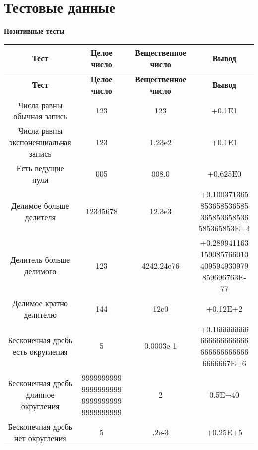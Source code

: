 \chapter{Тестовые данные}
{\noindent \textbf {Позитивные тесты}}
\begin{longtable}{|c|c|c|c|}
	\hline
	\textbf{Тест}& \textbf{Целое число} & \textbf{Вещественное число} & \textbf{Вывод} \\
	\hline
	\endfirsthead
	\hline
	\textbf{Тест}& \textbf{Целое число} & \textbf{Вещественное число} & \textbf{Вывод} \\
	\hline
	\endhead
	\makecell{Числа равны\\обычная запись} & 123 & 123 & +0.1E1 \\
	\hline
	\makecell{Числа равны\\экспоненциальная\\запись} & 123 & 1.23e2 & +0.1E1 \\
	\hline
	Есть ведущие нули & 005 & 008.0 & +0.625E0 \\
	\hline
	\makecell{Делимое больше\\делителя} & 12345678 & 12.3e3 & \makecell{+0.100371365\\853658536585\\365853658536\\585365853E+4} \\
	\hline
	\makecell{Делитель больше\\делимого} & 123 & 4242.24e76 & \makecell{+0.289941163\\159085766010\\409594930979\\859696763E-77} \\
	\hline
	\makecell{Делимое кратно\\делителю} & 144 & 12e0 & +0.12E+2 \\
	\hline
	\makecell{Бесконечная дробь\\есть округления} & 5 &  0.0003e-1 & \makecell{+0.166666666\\666666666666\\666666666666\\6666667E+6}\\
	\hline
	\makecell{Бесконечная дробь\\длинное округления} & \makecell{9999999999\\9999999999\\9999999999\\9999999999} & 2 & 0.5E+40\\
	\hline
	\makecell{Бесконечная дробь\\нет округления} & 5 & .2e-3 & +0.25E+5 \\

\end{longtable}
